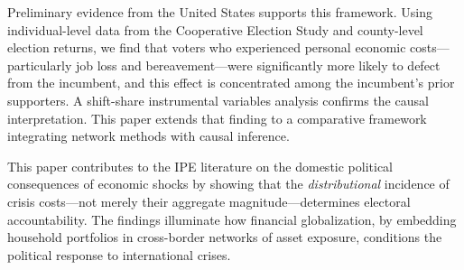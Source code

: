 \documentclass[12pt]{article}
\begin{document}
Preliminary evidence from the United States supports this framework. Using individual-level data from the Cooperative Election Study and county-level election returns, we find that voters who experienced personal economic costs---particularly job loss and bereavement---were significantly more likely to defect from the incumbent, and this effect is concentrated among the incumbent's prior supporters. A shift-share instrumental variables analysis confirms the causal interpretation. This paper extends that finding to a comparative framework integrating network methods with causal inference.

This paper contributes to the IPE literature on the domestic political consequences of economic shocks by showing that the \textit{distributional} incidence of crisis costs---not merely their aggregate magnitude---determines electoral accountability. The findings illuminate how financial globalization, by embedding household portfolios in cross-border networks of asset exposure, conditions the political response to international crises.
\end{document}
